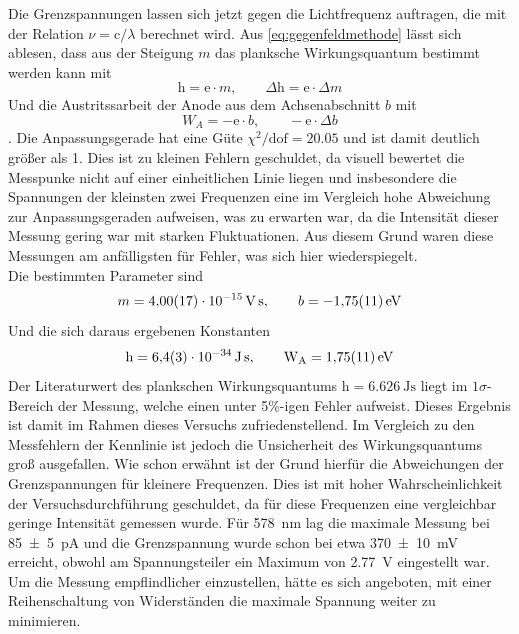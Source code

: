 Die Grenzspannungen lassen sich jetzt gegen die Lichtfrequenz auftragen, die mit
der Relation $\nu = \mathrm c / \lambda$ berechnet wird. Aus \cref{eq:gegenfeldmethode} lässt sich
ablesen, dass aus der Steigung $m$ das planksche Wirkungsquantum bestimmt werden kann mit
\begin{equation}
	\mathrm h = \mathrm e \cdot m,\qquad \Delta\mathrm h = \mathrm e \cdot \Delta m \nonumber
\end{equation}
Und die Austritssarbeit der Anode aus dem Achsenabschnitt $b$ mit
\begin{equation}
	W_A = -\mathrm e \cdot b, \qquad -\mathrm e \cdot \Delta b \nonumber
\end{equation}
. Die Anpassungsgerade hat eine Güte $\chi^2/\mathrm{dof} = \num{20.05}$ und ist damit deutlich größer als
\num{1}. Dies ist zu kleinen Fehlern geschuldet, da visuell bewertet die Messpunke nicht auf einer
einheitlichen Linie liegen und insbesondere die Spannungen der kleinsten zwei Frequenzen eine im Vergleich
hohe Abweichung zur Anpassungsgeraden aufweisen, was zu erwarten war, da die Intensität
dieser Messung gering war mit starken Fluktuationen. Aus diesem Grund waren diese Messungen
am anfälligsten für Fehler, was sich hier wiederspiegelt.\\
Die bestimmten Parameter sind
\[m = \SI{4.00(17)e-15}{\volt\second},\qquad b = -\SI{1.75\pm .11}{\electronvolt}\]
Und die sich daraus ergebenen Konstanten
\[\mathrm h = \SI{6.4(3)e-34}{\joule\second}, \qquad \mathrm W_{\mathrm A} = \SI{1.75\pm .11}{\electronvolt}\]
Der Literaturwert des plankschen Wirkungsquantums $\mathrm h = \SI{6.626}{\joule\second}$
liegt im $1\sigma$-Bereich der Messung, welche einen unter 5\%-igen Fehler aufweist.
Dieses Ergebnis ist damit im Rahmen dieses Versuchs zufriedenstellend. Im Vergleich 
zu den Messfehlern der Kennlinie ist jedoch die Unsicherheit des Wirkungsquantums 
groß ausgefallen. Wie schon erwähnt ist der Grund hierfür die Abweichungen 
der Grenzspannungen für kleinere Frequenzen. Dies ist mit hoher Wahrscheinlichkeit der 
Versuchsdurchführung geschuldet, da für diese Frequenzen eine vergleichbar geringe 
Intensität gemessen wurde. Für \SI{578}{\nano\meter} lag die maximale Messung bei \SI{85\pm 5}{\pico\ampere}
und die Grenzspannung wurde schon bei etwa \SI{370\pm 10}{\milli\volt} erreicht, obwohl
am Spannungsteiler ein Maximum von \SI{2.77}{\volt} eingestellt war.
Um die Messung empflindlicher einzustellen, hätte es sich angeboten, mit einer 
Reihenschaltung von Widerständen die maximale Spannung weiter zu minimieren.\\

